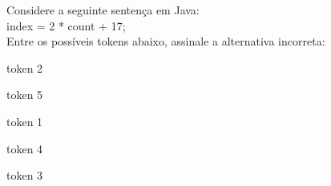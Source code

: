 \question[10]

Considere a seguinte sentença em Java:\\
index = 2 * count + 17;\\
Entre os possíveis tokens abaixo, assinale a alternativa incorreta:\\
\begin{choices}
\item token 2
\item token 5 %
\item token 1 
\item token 4
\item token 3 
\end{choices}
\answerline

